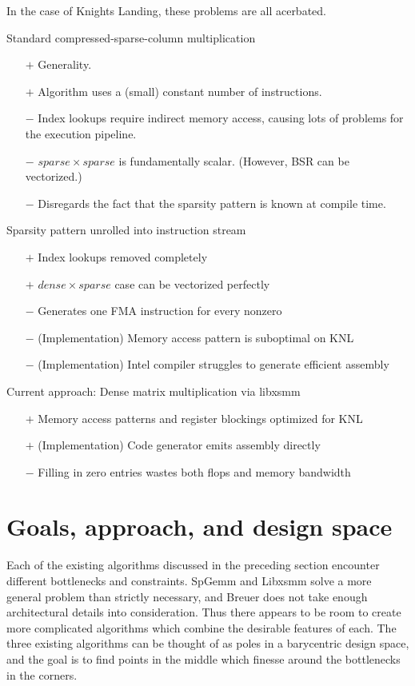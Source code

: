 In the case of Knights Landing, these problems are all acerbated. 


  Standard compressed-sparse-column multiplication
    \begin{itemize}
      \item[$+$] Generality.
      \item[$+$] Algorithm uses a (small) constant number of instructions.
      \item[$-$] Index lookups require indirect memory access, causing lots of problems for the execution pipeline.
      \item[$-$] $sparse \times sparse$ is fundamentally scalar. (However, BSR can be vectorized.)
      \item[$-$] Disregards the fact that the sparsity pattern is known at compile time.
    \end{itemize}

  Sparsity pattern unrolled into instruction stream
    \begin{itemize}
    \item[$+$] Index lookups removed completely
    \item[$+$] $dense \times sparse$ case can be vectorized perfectly 
    \item[$-$] Generates one FMA instruction for every nonzero
    \item[$-$] (Implementation) Memory access pattern is suboptimal on KNL
    \item[$-$] (Implementation) Intel compiler struggles to generate efficient assembly
    \end{itemize}

  Current approach: Dense matrix multiplication via libxsmm
    \begin{itemize}
    \item[$+$] Memory access patterns and register blockings optimized for KNL
    \item[$+$] (Implementation) Code generator emits assembly directly 
    \item[$-$] Filling in zero entries wastes both flops and memory bandwidth
    \end{itemize}


  \section{Goals, approach, and design space}

  Each of the existing algorithms discussed in the preceding section encounter different  bottlenecks and constraints. SpGemm and Libxsmm solve a more general problem than strictly necessary, and Breuer does not take enough architectural details into consideration. Thus there appears to be room to create more complicated algorithms which combine the desirable features of each. The three existing algorithms can be thought of as poles in a barycentric design space, and the goal is to find points in the middle which finesse around the bottlenecks in the corners.


